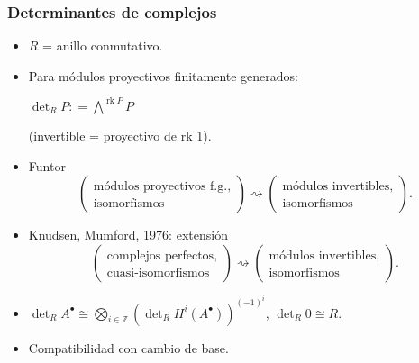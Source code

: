 \documentclass[handout]{beamer}
\newcommand{\ZZ}{\mathbb{Z}}
\newcommand{\dfn}{\mathrel{\mathop:}=}
\DeclareMathOperator{\rk}{rk}
\begin{document}

\begin{frame}
  \frametitle{Determinantes de complejos}

  \begin{itemize}
  \item $R$ = anillo conmutativo.

  \item Para módulos proyectivos finitamente generados:

    $\det\nolimits_R P \dfn \bigwedge^{\rk P} P$

    (invertible = proyectivo de rk 1).

  \item Funtor
    \[ \left(\!\!\begin{array}{c}
              \text{módulos proyectivos f.g.}, \\
              \text{isomorfismos}
       \end{array}\!\!\right) \rightsquigarrow
       \left(\!\!\begin{array}{c}
               \text{módulos invertibles}, \\
               \text{isomorfismos}
       \end{array}\!\!\right). \]

  \item Knudsen, Mumford, 1976: extensión
    \[ \left(\!\!\begin{array}{c}
              \text{complejos perfectos}, \\
              \text{cuasi-isomorfismos}
       \end{array}\!\!\right) \rightsquigarrow
       \left(\!\!\begin{array}{c}
                \text{módulos invertibles}, \\
                \text{isomorfismos}
       \end{array}\!\!\right). \]

 \item $\det\nolimits_R A^\bullet \cong \bigotimes_{i\in \ZZ} (\det_R H^i (A^\bullet))^{(-1)^i}$,
   $\det\nolimits_R 0 \cong R$.

  \item Compatibilidad con cambio de base.
  \end{itemize}
\end{frame}

\end{document}
